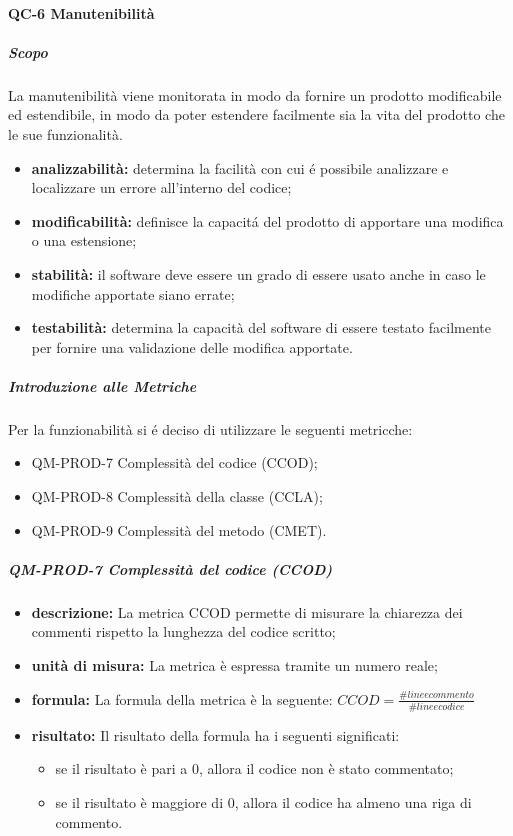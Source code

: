 		\paragraph{QC-6 Manutenibilità}
			\subparagraph{Scopo}
				La manutenibilità viene monitorata in modo da fornire un prodotto modificabile ed estendibile, in modo da poter estendere facilmente sia la vita del prodotto che le sue funzionalità.
				\begin{itemize}
					\item \textbf{analizzabilità:} determina la facilità con cui é possibile analizzare e localizzare un errore all'interno del codice;
					\item \textbf{modificabilità:} definisce la capacitá del prodotto di apportare una modifica o una estensione;
					\item \textbf{stabilità:} il software deve essere un grado di essere usato anche in caso le modifiche apportate siano errate;
					\item \textbf{testabilità:} determina la capacità del software di essere testato facilmente per fornire una validazione delle modifica apportate.
				\end{itemize}
			\subparagraph{Introduzione alle Metriche}
				Per la funzionabilità si é deciso di utilizzare le seguenti metricche:
				\begin{itemize}
					\item QM-PROD-7 Complessità del codice (CCOD);
					\item QM-PROD-8 Complessità della classe (CCLA);
					\item QM-PROD-9 Complessità del metodo (CMET).
				\end{itemize}
			\subparagraph{QM-PROD-7 Complessità del codice (CCOD)}
			\begin{itemize}
      			\item \textbf{descrizione: }
					La metrica CCOD permette di misurare la chiarezza dei commenti rispetto la lunghezza del codice scritto;
				\item \textbf{unità di misura: }
					La metrica è espressa tramite un numero reale;
				\item \textbf{formula: }
					La formula della metrica è la seguente:
				 \(
				 		CCOD = \frac{\# linee commento}{\# linee codice}
				 \)
				\item \textbf{risultato: }
					Il risultato della formula ha i seguenti significati:
					\begin{itemize}
						\item se il risultato è pari a 0, allora il codice non è stato commentato;
						\item se il risultato è maggiore di 0, allora il codice ha almeno una riga di commento.
					\end{itemize}
			\end{itemize}
